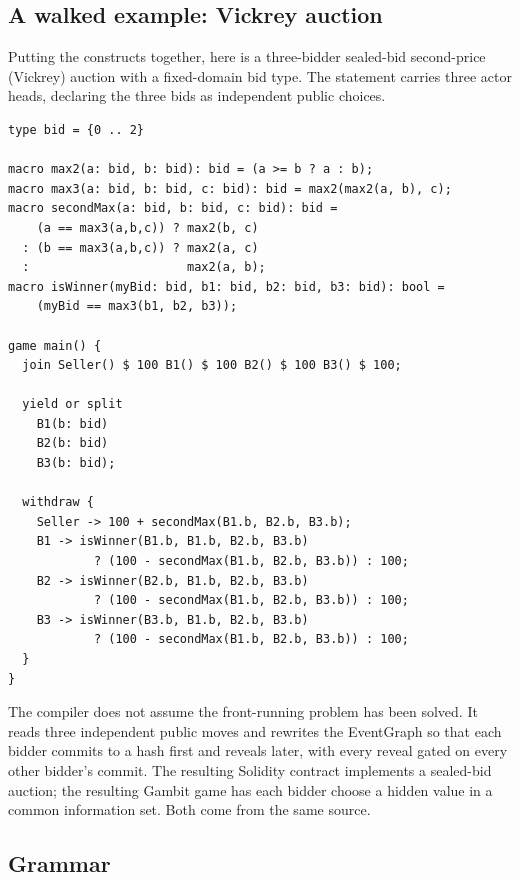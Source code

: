 \subsection{A walked example: Vickrey auction}
\label{sec:lang:vickrey}

Putting the constructs together, here is a three-bidder sealed-bid
second-price (Vickrey) auction with a fixed-domain bid type.  The
 statement carries three actor heads, declaring
the three bids as independent public choices.

\begin{lstlisting}[style=vg]
type bid = {0 .. 2}

macro max2(a: bid, b: bid): bid = (a >= b ? a : b);
macro max3(a: bid, b: bid, c: bid): bid = max2(max2(a, b), c);
macro secondMax(a: bid, b: bid, c: bid): bid =
    (a == max3(a,b,c)) ? max2(b, c)
  : (b == max3(a,b,c)) ? max2(a, c)
  :                      max2(a, b);
macro isWinner(myBid: bid, b1: bid, b2: bid, b3: bid): bool =
    (myBid == max3(b1, b2, b3));

game main() {
  join Seller() $ 100 B1() $ 100 B2() $ 100 B3() $ 100;

  yield or split
    B1(b: bid)
    B2(b: bid)
    B3(b: bid);

  withdraw {
    Seller -> 100 + secondMax(B1.b, B2.b, B3.b);
    B1 -> isWinner(B1.b, B1.b, B2.b, B3.b)
            ? (100 - secondMax(B1.b, B2.b, B3.b)) : 100;
    B2 -> isWinner(B2.b, B1.b, B2.b, B3.b)
            ? (100 - secondMax(B1.b, B2.b, B3.b)) : 100;
    B3 -> isWinner(B3.b, B1.b, B2.b, B3.b)
            ? (100 - secondMax(B1.b, B2.b, B3.b)) : 100;
  }
}
\end{lstlisting}

The compiler does not assume the front-running problem has been
solved.  It reads three independent public moves and rewrites the
EventGraph so that each bidder commits to a hash first and reveals
later, with every reveal gated on every other bidder's commit.
The resulting Solidity contract implements a sealed-bid auction;
the resulting Gambit game has each bidder choose a hidden value in
a common information set.  Both come from the same source.

\subsection{Grammar}

